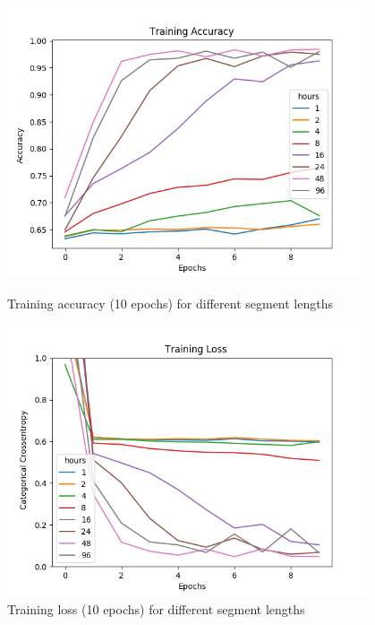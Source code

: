 \begin{figure}
      \includegraphics[height=8cm]{img/control_condition/plot_acc_train.png}
      \caption{Training accuracy (10 epochs) for different segment lengths}
      \label{figure:control_condition_acc_train}

      \includegraphics[height=8cm]{img/control_condition/plot_loss_train.png}
      \caption{Training loss (10 epochs) for different segment lengths}
      \label{figure:control_condition_loss_train}
\end{figure}

